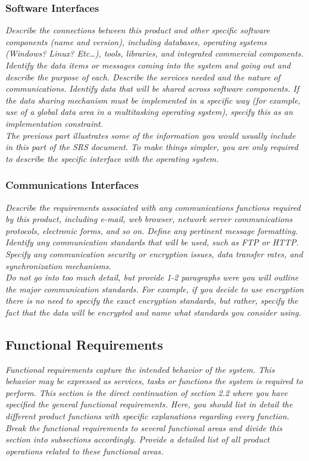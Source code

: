 \documentclass{article}
\newcommand{\gnl}{\vspace{1em}\\}      %
\begin{document}
        \subsubsection{Software Interfaces}
            \emph{Describe the connections between this product and other specific software components (name and version), including databases, operating systems (Windows? Linux? Etc\dots), tools, libraries, and integrated commercial components. Identify the data items or messages coming into the system and going out and describe the purpose of each. Describe the services needed and the nature of communications. Identify data that will be shared across software components. If the data sharing mechanism must be implemented in a specific way (for example, use of a global data area in a multitasking operating system), specify this as an implementation constraint.\gnl The previous part illustrates some of the information you would usually include in this part of the SRS document. To make things simpler, you are only required to describe the specific interface with the operating system.}
        \subsubsection{Communications Interfaces}
            \emph{Describe the requirements associated with any communications functions required by this product, including e-mail, web browser, network server communications protocols, electronic forms, and so on. Define any pertinent message formatting. Identify any communication standards that will be used, such as FTP or HTTP. Specify any communication security or encryption issues, data transfer rates, and synchronization mechanisms.\gnl Do not go into too much detail, but provide 1-2 paragraphs were you will outline the major communication standards. For example, if you decide to use encryption there is no need to specify the exact encryption standards, but rather, specify the fact that the data will be encrypted and name what standards you consider using.}
    \subsection{Functional Requirements}
        \emph{Functional requirements capture the intended behavior of the system. This behavior may be expressed as services, tasks or functions the system is required to perform. This section is the direct continuation of section 2.2 where you have specified the general functional requirements. Here, you should list in detail the different product functions with specific explanations regarding every function.\gnl Break the functional requirements to several functional areas and divide this section into subsections accordingly. Provide a detailed list of all product operations related to these functional areas.}
\end{document}
